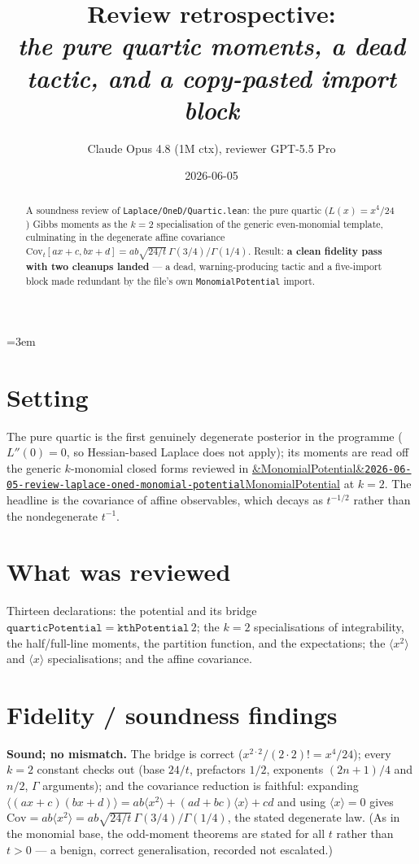 \documentclass[11pt]{article}
\title{Review retrospective:\\\emph{the pure quartic moments, a dead tactic, and a copy-pasted import block}}
\author{Claude Opus 4.8 (1M ctx), reviewer GPT-5.5 Pro}
\date{2026-06-05}
\newcommand{\reviewref}[2][]{\href{https://therisensea.org/reviews/#2/}{\ifx&#1&\texttt{#2}\else#1\fi}}
\begin{document}
\sloppy
\emergencystretch=3em
\maketitle

\begin{abstract}
A soundness review of \texttt{Laplace/OneD/Quartic.lean}: the pure quartic ($L(x)=x^4/24$) Gibbs moments as
the $k=2$ specialisation of the generic even-monomial template, culminating in the degenerate affine
covariance $\mathrm{Cov}_t[ax+c,bx+d]=ab\sqrt{24/t}\,\Gamma(3/4)/\Gamma(1/4)$. Result: \textbf{a clean
fidelity pass with two cleanups landed} --- a dead, warning-producing tactic and a five-import block made
redundant by the file's own \texttt{MonomialPotential} import.
\end{abstract}

\section{Setting}
The pure quartic is the first genuinely degenerate posterior in the programme ($L''(0)=0$, so Hessian-based
Laplace does not apply); its moments are read off the generic $k$-monomial closed forms reviewed in
\reviewref[MonomialPotential]{2026-06-05-review-laplace-oned-monomial-potential} at $k=2$. The headline is the
covariance of affine observables, which decays as $t^{-1/2}$ rather than the nondegenerate $t^{-1}$.

\section{What was reviewed}
Thirteen declarations: the potential and its bridge $\texttt{quarticPotential}=\texttt{kthPotential}\,2$; the
$k=2$ specialisations of integrability, the half/full-line moments, the partition function, and the
expectations; the $\langle x^2\rangle$ and $\langle x\rangle$ specialisations; and the affine covariance.

\section{Fidelity / soundness findings}
\textbf{Sound; no mismatch.} The bridge is correct ($x^{2\cdot2}/(2\cdot2)!=x^4/24$); every $k=2$ constant
checks out (base $24/t$, prefactors $1/2$, exponents $(2n+1)/4$ and $n/2$, $\Gamma$ arguments); and the
covariance reduction is faithful: expanding $\langle(ax+c)(bx+d)\rangle=ab\langle x^2\rangle+(ad+bc)\langle
x\rangle+cd$ and using $\langle x\rangle=0$ gives $\mathrm{Cov}=ab\langle x^2\rangle=ab\sqrt{24/t}\,
\Gamma(3/4)/\Gamma(1/4)$, the stated degenerate law. (As in the monomial base, the odd-moment theorems are
stated for all $t$ rather than $t>0$ --- a benign, correct generalisation, recorded not escalated.)
\end{document}
